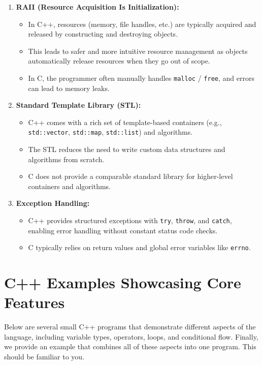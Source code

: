 \documentclass[a4paper,12pt]{article}
\begin{document}
\begin{enumerate}
    \item \textbf{RAII (Resource Acquisition Is Initialization):}
    \begin{itemize}
        \item In C++, resources (memory, file handles, etc.) are typically acquired and released by constructing and destroying objects.
        \item This leads to safer and more intuitive resource management as objects automatically release resources when they go out of scope.
        \item In C, the programmer often manually handles \texttt{malloc} / \texttt{free}, and errors can lead to memory leaks.
    \end{itemize}
    
    \item \textbf{Standard Template Library (STL):}
    \begin{itemize}
        \item C++ comes with a rich set of template-based containers (e.g., \texttt{std::vector}, \texttt{std::map}, \texttt{std::list}) and algorithms.
        \item The STL reduces the need to write custom data structures and algorithms from scratch.
        \item C does not provide a comparable standard library for higher-level containers and algorithms.
    \end{itemize}
    
    \item \textbf{Exception Handling:}
    \begin{itemize}
        \item C++ provides structured exceptions with \texttt{try}, \texttt{throw}, and \texttt{catch}, enabling error handling without constant status code checks.
        \item C typically relies on return values and global error variables like \texttt{errno}.
    \end{itemize}
\end{enumerate}

\section*{C++ Examples Showcasing Core Features}

Below are several small C++ programs that demonstrate different aspects of the language, including variable types, operators, loops, and conditional flow. Finally, we provide an example that combines all of these aspects into one program. This should be familiar to you.
\end{document}
